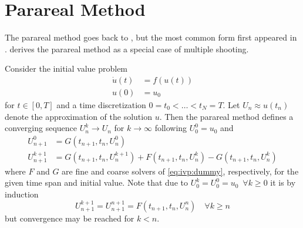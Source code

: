 \chapter{Parareal Method}

The parareal method goes back to \cite{Lions2001},
but the most common form first appeared in \cite{Baffico2002}.
\cite{Gander2007} derives the parareal method as a special case of multiple shooting.

Consider the initial value problem
\begin{align}
  \label{eq:ivp:dummy}
  \dot u(t) &= f(u(t)) \\
  u(0) &= u_0
\end{align}
for $t \in [0,T]$ and a time discretization $0 = t_0 < \ldots < t_N = T$.
Let $U_n \approx u(t_n)$ denote the approximation of the solution $u$.
Then the parareal method defines a converging sequence $U_n^k \to U_n$ for $k\to\infty$ following $U_0^0=u_0$ and
\begin{align*}
  U_{n+1}^0 &= G(t_{n+1}, t_n, U_n^0) \\
  U_{n+1}^{k+1} &=
  G(t_{n+1}, t_n, U_n^{k+1}) +
  F(t_{n+1}, t_n, U_n^k) -
  G(t_{n+1}, t_n, U_n^k)
\end{align*}
where $F$ and $G$ are fine and coarse solvers of \eqref{eq:ivp:dummy}, respectively,
for the given time span and initial value.
Note that due to $U_0^k = U_0^0 = u_0 \enspace \forall k\geq 0$ it is by induction
\begin{equation}
  U_{n+1}^{k+1} = U_{n+1}^{n+1} = F(t_{n+1}, t_n, U_n^n)
  \quad
  \forall k \geq n
\end{equation}
but convergence may be reached for $k<n$.
